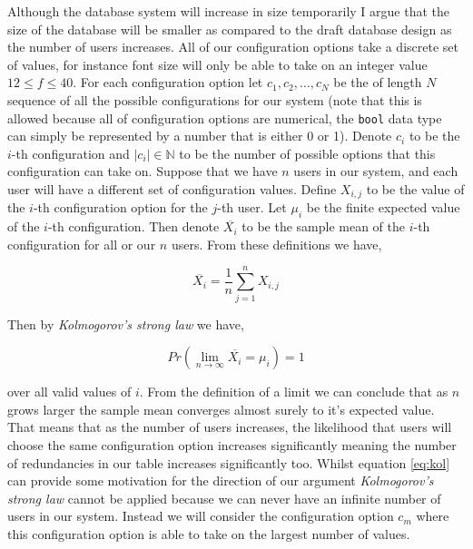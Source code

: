 Although the
database system will increase in size temporarily I argue that
the size of the database will be smaller as compared to the 
draft database design as the number of users increases. All of
our configuration options take a discrete set of values, for 
instance font size will only be able to take on an integer
value $12 \leq f \leq 40$. For each configuration option let
$c_1, c_2, \ldots, c_N$ be the of length $N$ sequence of all
the possible configurations for our 
system (note that this is allowed because all of configuration
options are numerical, the \texttt{bool} data type can simply
be represented by a number that is either 0 or 1). Denote
$c_i$ to be the $i$-th configuration and $|c_i| \in \mathbb{N}$
to be the number of possible options that this configuration 
can take on. Suppose that we have $n$ users in our system, 
and each user will have a different set of configuration 
values.
Define $X_{i, j}$ to be the value of the $i$-th configuration
option for the $j$-th user.
Let $\mu_i$ be the finite expected
value of the $i$-th configuration. Then denote $\overline{X_i}$ to 
be the sample mean of the $i$-th configuration for all or our
$n$ users. From these definitions we have,

\begin{equation} 
  \overline{X_i} = \frac{1}{n} \sum_{j=1}^n X_{i, j}
\end{equation}

Then by \textit{Kolmogorov's strong law} \cite{thm}
we have,

\begin{equation} \label{eq:kol}
  Pr \left(\lim_{n \to \infty} \overline{X_i} = \mu_i \right) = 1
\end{equation}

over all valid values of $i$. From the definition of a limit
we can conclude that as $n$ grows larger the sample mean 
converges almost surely to it's expected value. That means
that as the number of users increases, the likelihood that 
users will choose the same configuration option increases 
significantly meaning the number of redundancies in our table 
increases significantly too. Whilst
equation \ref{eq:kol} can provide some motivation for the 
direction of our argument \textit{Kolmogorov's strong law}
cannot be applied because we can never have an infinite number
of users in our system. Instead we will consider the
configuration option $c_m$ where this configuration option is
able to take on the largest number of values.\\ \vspace{0.2cm}

